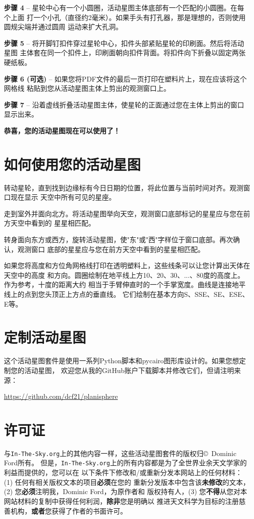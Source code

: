 \documentclass[a4paper,onecolumn,10pt]{article}
\begin{document}
{\bf 步骤 4} -- 星轮中心有一个小圆圈，活动星图主体底部有一个匹配的小圆圈。在每个上面
打一个小孔（直径约2毫米）。如果手头有打孔器，那是理想的，否则使用圆规尖端并通过圆周
运动来扩大孔洞。

{\bf 步骤 5} -- 将开脚钉扣件穿过星轮中心，扣件头部紧贴星轮的印刷面。然后将活动星图
主体套在同一个扣件上，印刷面朝向扣件背面。将扣件向下折叠以固定两张硬纸板。

{\bf 步骤 6 (可选)} -- 如果您将PDF文件的最后一页打印在塑料片上，现在应该将这个网格线
粘贴到您从活动星图主体上剪出的观测窗口上。

{\bf 步骤 7} -- 沿着虚线折叠活动星图主体，使星轮的正面通过您在主体上剪出的窗口显示出来。

{\bf 恭喜，您的活动星图现在可以使用了！}

\section*{如何使用您的活动星图}

转动星轮，直到找到边缘标有今日日期的位置，将此位置与当前时间对齐。观测窗口现在显示
天空中所有可见的星座。

走到室外并面向北方。将活动星图举向天空，观测窗口底部标记的星星应与您在前方天空中看到的
星星相匹配。

转身面向东方或西方，旋转活动星图，使"东"或"西"字样位于窗口底部。再次确认，观测窗口
底部的星星应与您在前方天空中看到的星星相匹配。

如果您将高度和方位角网格线打印在透明塑料上，这些线条可以让您计算出天体在天空中的高度
和方向。圆圈绘制在地平线上方10、20、30、...、80度的高度上。作为参考，十度的距离大约
相当于手臂伸直时的一个手掌宽度。曲线是连接地平线上的点到您头顶正上方点的垂直线。
它们绘制在基本方向S、SSE、SE、ESE、E等。

\section*{定制活动星图}

这个活动星图套件是使用一系列Python脚本和pycairo图形库设计的。如果您想定制您的活动星图，
欢迎您从我的GitHub账户下载脚本并修改它们，但请注明来源：

\url{https://github.com/dcf21/planisphere}

\section*{许可证}

与{\tt In-The-Sky.org}上的其他内容一样，这些活动星图套件的版权归\copyright\ Dominic Ford所有。
但是，{\tt In-The-Sky.org}上的所有内容都是为了全世界业余天文学家的利益而提供的，您可以在
以下条件下修改和/或重新分发本网站上的任何材料：(1) 任何有相关版权文本的项目{\bf 必须}在您的
重新分发版本中包含该{\bf 未修改}的文本，(2) 您{\bf 必须}注明我，Dominic Ford，为原作者和
版权持有人，(3) 您{\bf 不得}从您对本网站材料的复制中获得任何利润，{\bf 除非}您是明确以
推进天文科学为目标的注册慈善机构，{\bf 或者}您获得了作者的书面许可。
\end{document}
